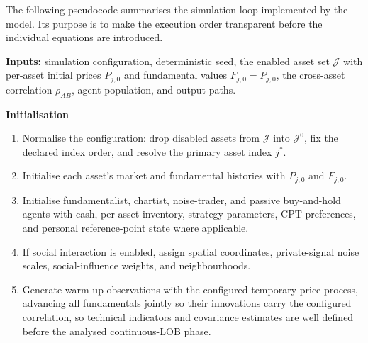 \documentclass[12pt, a4paper]{article}
\begin{document}
    The following pseudocode summarises the simulation loop implemented by the
    model. Its purpose is to make the execution order transparent before the
    individual equations are introduced.

    \begin{framed}
                \raggedright
                \textbf{Inputs:} simulation configuration, deterministic seed, the enabled
                asset set \(\mathcal{J}\) with per-asset initial prices \(P_{j,0}\) and
                fundamental values \(F_{j,0}=P_{j,0}\), the cross-asset correlation
                \(\rho_{AB}\), agent population, and output paths.

                \textbf{Initialisation}
                \begin{enumerate}
                    \item Normalise the configuration: drop disabled assets from
                    \(\mathcal{J}\) into \(\mathcal{J}^{0}\), fix the declared index order,
                    and resolve the primary asset index \(j^{\ast}\).
                    \item Initialise each asset's market and fundamental histories with
                    \(P_{j,0}\) and \(F_{j,0}\).
                    \item Initialise fundamentalist, chartist, noise-trader, and passive
                    buy-and-hold agents with cash, per-asset inventory, strategy parameters, CPT
                    preferences, and personal reference-point state where applicable.
                    \item If social interaction is enabled, assign spatial coordinates,
                    private-signal noise scales, social-influence weights, and neighbourhoods.
                    \item Generate warm-up observations with the configured temporary price
                    process, advancing all fundamentals jointly so their innovations carry the
                    configured correlation, so technical indicators and covariance estimates
                    are well defined before the analysed continuous-LOB phase.
                \end{enumerate}


\end{framed}
\end{document}

